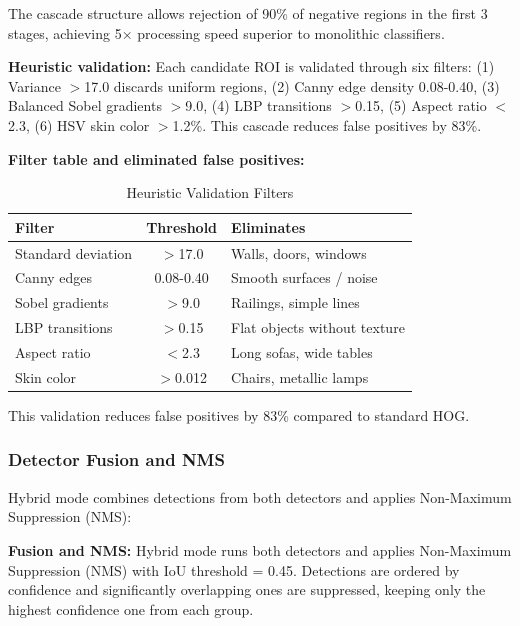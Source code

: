 \documentclass[conference]{IEEEtran}
\begin{document}
The cascade structure allows rejection of 90\% of negative regions in the first 3 stages, achieving 5× processing speed superior to monolithic classifiers.



\textbf{Heuristic validation:} Each candidate ROI is validated through six filters: (1) Variance $>$17.0 discards uniform regions, (2) Canny edge density 0.08-0.40, (3) Balanced Sobel gradients $>$9.0, (4) LBP transitions $>$0.15, (5) Aspect ratio $<$2.3, (6) HSV skin color $>$1.2\%. This cascade reduces false positives by 83\%.

\textbf{Filter table and eliminated false positives:}

\begin{table}[htbp]
\caption{Heuristic Validation Filters}
\begin{center}
\begin{tabular}{|l|c|l|}
\hline
\textbf{Filter} & \textbf{Threshold} & \textbf{Eliminates} \\
\hline
Standard deviation & $>$17.0 & Walls, doors, windows \\
Canny edges & 0.08-0.40 & Smooth surfaces / noise \\
Sobel gradients & $>$9.0 & Railings, simple lines \\
LBP transitions & $>$0.15 & Flat objects without texture \\
Aspect ratio & $<$2.3 & Long sofas, wide tables \\
Skin color & $>$0.012 & Chairs, metallic lamps \\
\hline
\end{tabular}
\end{center}
\end{table}

This validation reduces false positives by 83\% compared to standard HOG.

\subsubsection{Detector Fusion and NMS}

Hybrid mode combines detections from both detectors and applies Non-Maximum Suppression (NMS):

\textbf{Fusion and NMS:} Hybrid mode runs both detectors and applies Non-Maximum Suppression (NMS) with IoU threshold = 0.45. Detections are ordered by confidence and significantly overlapping ones are suppressed, keeping only the highest confidence one from each group.
\end{document}
